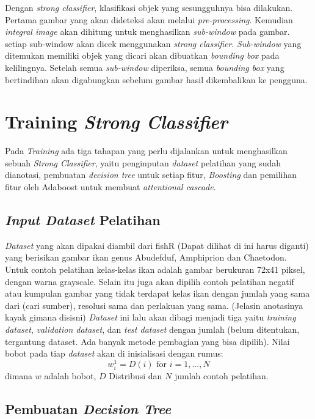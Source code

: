 Dengan \emph{strong classifier}, klasifikasi objek yang sesungguhnya bisa dilakukan. 
Pertama gambar yang akan dideteksi akan melalui \emph{pre-processing}. 
Kemudian \emph{integral image} akan dihitung untuk 
menghasilkan \emph{sub-window} pada gambar. setiap sub-window akan dicek menggunakan 
\emph{strong classifier}. \emph{Sub-window} yang ditemukan memiliki objek yang 
dicari akan dibuatkan \emph{bounding box} pada kelilingnya. Setelah semua 
\emph{sub-window} diperiksa, semua \emph{bounding box} yang bertindihan akan 
digabungkan sebelum gambar hasil dikembalikan ke pengguna.

\section{Training \emph{Strong Classifier}}

Pada \textit{Training} ada tiga tahapan yang perlu dijalankan 
untuk menghasilkan sebuah \emph{Strong Classifier}, 
yaitu penginputan \textit{dataset} pelatihan yang sudah dianotasi, 
pembuatan \emph{decision tree} untuk setiap fitur, 
\emph{Boosting }dan pemilihan fitur oleh Adaboost untuk membuat \emph{attentional cascade}.

\subsection{\textit{Input Dataset} Pelatihan}

\textit{Dataset} yang akan dipakai diambil dari fishR (Dapat dilihat di 
 ini harus diganti) yang 
berisikan gambar ikan genus Abudefduf, Amphiprion dan Chaetodon. 
Untuk contoh pelatihan kelas-kelas ikan adalah gambar berukuran 72x41 piksel, 
dengan warna grayscale. Selain itu juga akan dipilih contoh 
pelatihan negatif atau kumpulan gambar yang tidak terdapat kelas 
ikan dengan jumlah yang sama dari (cari sumber), resolusi sama dan perlakuan 
yang sama. (Jelasin anotasinya kayak gimana disisni) \textit{Dataset} ini lalu 
akan dibagi menjadi tiga yaitu \textit{training dataset}, 
\textit{validation dataset}, dan \emph{test dataset} dengan jumlah 
(belum ditentukan, tergantung dataset. 
Ada banyak metode pembagian yang bisa dipilih).
Nilai bobot pada tiap \textit{dataset} akan di inisialisasi dengan rumus:
\begin{equation}
  w^1_i = D(i) \text{ for } i=1,...,N
\end{equation}
dimana $w$ adalah bobot, $D$ Distribusi dan $N$ jumlah contoh pelatihan.

\subsection{Pembuatan \textit{Decision Tree}}


